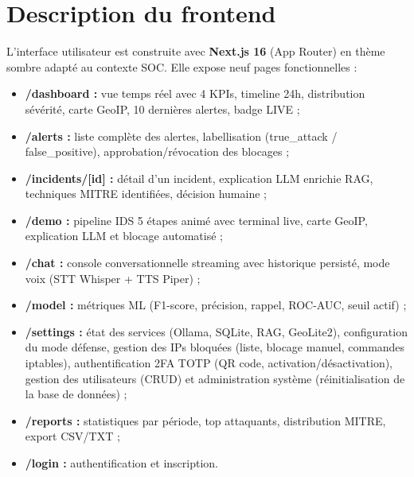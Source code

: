 \documentclass[12pt,a4paper]{report}
\begin{document}
\section{Description du frontend}
\begin{onehalfspace}
L'interface utilisateur est construite avec \textbf{Next.js 16} (App Router)
en thème sombre adapté au contexte SOC. Elle expose neuf pages fonctionnelles :

\begin{itemize}
  \item[\ding{43}] \textbf{/dashboard :} vue temps réel avec 4 KPIs, timeline
  24h, distribution sévérité, carte GeoIP, 10 dernières alertes, badge LIVE ;
  \item[\ding{43}] \textbf{/alerts :} liste complète des alertes, labellisation
  (true\_attack / false\_positive), approbation/révocation des blocages ;
  \item[\ding{43}] \textbf{/incidents/[id] :} détail d'un incident, explication
  LLM enrichie RAG, techniques MITRE identifiées, décision humaine ;
  \item[\ding{43}] \textbf{/demo :} pipeline IDS 5 étapes animé avec terminal
  live, carte GeoIP, explication LLM et blocage automatisé ;
  \item[\ding{43}] \textbf{/chat :} console conversationnelle streaming avec
  historique persisté, mode voix (STT Whisper + TTS Piper) ;
  \item[\ding{43}] \textbf{/model :} métriques ML (F1-score, précision,
  rappel, ROC-AUC, seuil actif) ;
  \item[\ding{43}] \textbf{/settings :} état des services (Ollama, SQLite,
  RAG, GeoLite2), configuration du mode défense, gestion des IPs bloquées
  (liste, blocage manuel, commandes iptables), authentification 2FA TOTP
  (QR code, activation/désactivation), gestion des utilisateurs (CRUD) et
  administration système (réinitialisation de la base de données) ;
  \item[\ding{43}] \textbf{/reports :} statistiques par période, top
  attaquants, distribution MITRE, export CSV/TXT ;
  \item[\ding{43}] \textbf{/login :} authentification et inscription.
\end{itemize}
\end{onehalfspace}
\end{document}
